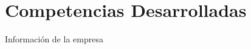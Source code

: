 \renewcommand{\thesection}{\Roman{section}}
\section{Competencias Desarrolladas}

{\large Información de la empresa}\\